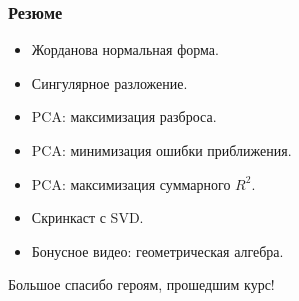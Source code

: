 
  




\begin{frame}
  \frametitle{Резюме}

  \begin{itemize}[<+->]
  \item Жорданова нормальная форма.
  \item Сингулярное разложение.
  \item PCA: максимизация разброса.
  \item PCA: минимизация ошибки приближения.
  \item PCA: максимизация суммарного $R^2$.
  \item Скринкаст с SVD.
  \item Бонусное видео: геометрическая алгебра.
  \end{itemize}
  \pause
  
  \alert{Большое спасибо героям, прошедшим курс!}
      


\end{frame}